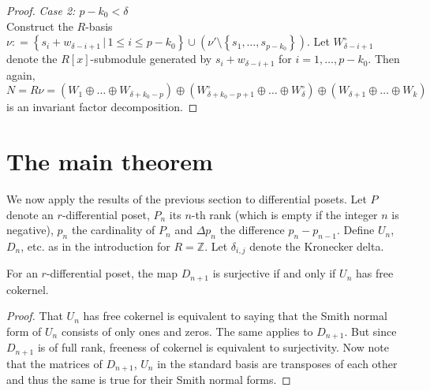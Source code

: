 \documentclass[ALCO, Unicode]{cedram}
\newcommand{\ZZ}{\mathbb{Z}}
\begin{document}
\begin{proof}
\textit{Case 2: $p-k_{0} < \delta $}\\

Construct the $ R$-basis $ \nu : =  \left \{  s_{i} + w_{\delta - i + 1   }  \, | \, 1 \leq i \leq   p - k_{0}    \right \}     \cup ( \nu' \setminus \left \{  s_{1}, \ldots, s_{ p - k_{0}}   \right \}   )   $.  Let $ W_{\delta - i  + 1 }^{\circ} $ denote the $ R[x]$-submodule generated by $ s_{i} + w_{\delta - i + 1 }  $ for $ i = 1, \ldots, p -  k_{0} $. Then again, 
$$ N = R \nu = \left (  W_{1} \oplus \ldots \oplus W_{ \delta  + k _{0 } - p } \right )  \oplus  \left (  W_{ \delta  + k_{0}  - p %
   + 1 }^{\circ}   \oplus \ldots \oplus  W_{\delta } ^\circ \right )    \oplus \left (   W_{\delta+1} \oplus  \ldots \oplus  W_{k}  \right )    $$  
is an invariant factor decomposition.    
 \end{proof} 





\section{The main theorem}    
We now apply the results of the previous section to differential posets. Let $  P $ denote an $ r $-differential poset, $ P_{n} $ its $ n $-th rank (which is empty if the integer  $ n $ is negative),  $ p_{n} $ the cardinality of $ P_{n} $ and $ \Delta p_{n} $ the difference  $  p_{n} - p_{n-1} $. Define $U_{n}$, $D_{n}$, etc. as in the  introduction  for  $ R = \ZZ $. Let $ \delta_{i,j} $ denote the Kronecker delta.     

\begin{lemma}       \label{freecokernel}                For  an  $ r $-differential poset, the map $ D_{n+1} $ is surjective    if and only if $ U_{n}   $ has free cokernel.                          
\end{lemma}      


\begin{proof} That $ U_{n} $ has free cokernel is equivalent to saying that the Smith normal form of $ U_{n} $ consists of only ones and  zeros.  The same applies to $ D_{n+1} $. But since $ D_{n+1} $ is of full rank, freeness of cokernel is equivalent to  surjectivity. Now note that the matrices of  $ D_{n+1} $, $ U_{n} $ in the standard basis are transposes  of each other and thus the same is true for their Smith normal forms. 
\end{proof}          
\end{document}
